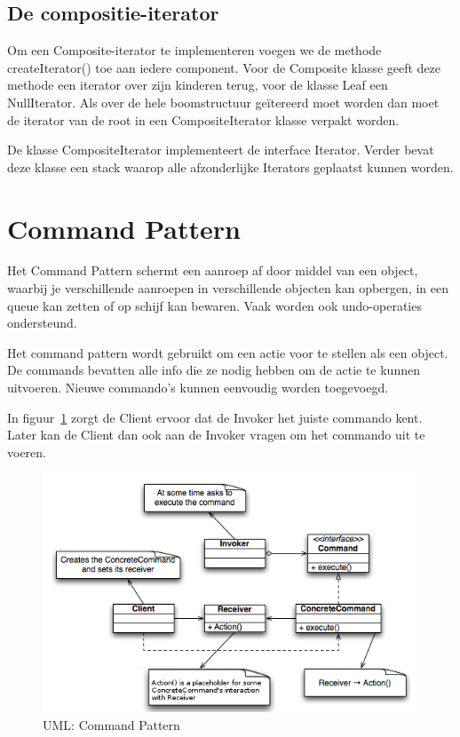 \documentclass[a4paper,12pt]{article}
\begin{document}
\subsection{De compositie-iterator}
Om een Composite-iterator te implementeren voegen we de methode createIterator() toe aan iedere component.
Voor de Composite klasse geeft deze methode een iterator over zijn kinderen terug, voor de klasse Leaf een NullIterator. Als over de hele boomstructuur geïtereerd moet worden dan moet de iterator van de root in een CompositeIterator klasse verpakt worden.

De klasse CompositeIterator implementeert de interface Iterator.
Verder bevat deze klasse een stack waarop alle afzonderlijke Iterators geplaatst kunnen worden.

\section{Command Pattern}
Het Command Pattern schermt een aanroep af door middel van een object, waarbij je verschillende aanroepen in verschillende objecten kan opbergen, in een queue kan zetten of op schijf kan bewaren.
Vaak worden ook undo-operaties ondersteund.

Het command pattern wordt gebruikt om een actie voor te stellen als een object. De commands bevatten alle info die ze nodig hebben om de actie te kunnen uitvoeren. Nieuwe commando's kunnen eenvoudig worden toegevoegd.

In figuur~\ref{fig:Command} zorgt de Client ervoor dat de Invoker het juiste commando kent. Later kan de Client dan ook aan de Invoker vragen om het commando uit te voeren.

\begin{figure}[H]
\centering
  	\includegraphics[width=.7\linewidth]{img/CommandPattern.png}
  	\caption{UML: Command Pattern}
  	\label{fig:Command}
\end{figure}
\end{document}
